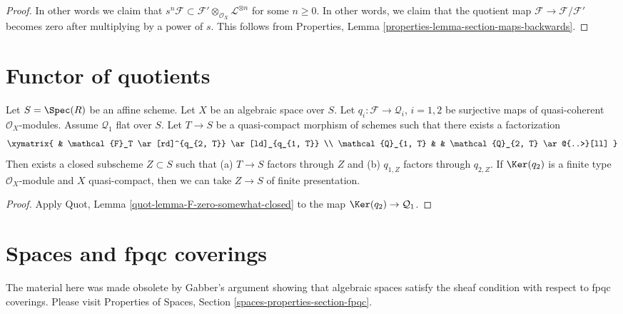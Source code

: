 \begin{proof}
In other words we claim that
$s^n\mathcal{F} \subset
\mathcal{F}' \otimes_{\mathcal{O}_X} \mathcal{L}^{\otimes n}$
for some $n \geq 0$. In other words, we claim that the quotient map
$\mathcal{F} \to \mathcal{F}/\mathcal{F}'$ becomes
zero after multiplying by a power of $s$.
This follows from Properties, Lemma
\ref{properties-lemma-section-maps-backwards}.
\end{proof}






\section{Functor of quotients}
\label{section-quotients}

\begin{lemma}
\label{lemma-factors-through-quotient}
Let $S = \Spec(R)$ be an affine scheme. Let $X$ be an algebraic space over
$S$. Let $q_i : \mathcal{F} \to \mathcal{Q}_i$, $i = 1, 2$
be surjective maps of quasi-coherent $\mathcal{O}_X$-modules.
Assume $\mathcal{Q}_1$ flat over $S$. Let $T \to S$ be a quasi-compact
morphism of schemes such that there exists a factorization
$$
\xymatrix{
& \mathcal{F}_T \ar[rd]^{q_{2, T}} \ar[ld]_{q_{1, T}} \\
\mathcal{Q}_{1, T} & & \mathcal{Q}_{2, T} \ar@{..>}[ll]
}
$$
Then exists a closed subscheme $Z \subset S$ such that
(a) $T \to S$ factors through $Z$ and (b)
$q_{1, Z}$ factors through $q_{2, Z}$.
If $\Ker(q_2)$ is a finite type $\mathcal{O}_X$-module and $X$
quasi-compact, then we can take $Z \to S$ of finite presentation.
\end{lemma}

\begin{proof}
Apply Quot, Lemma \ref{quot-lemma-F-zero-somewhat-closed}
to the map $\Ker(q_2) \to \mathcal{Q}_1$.
\end{proof}







\section{Spaces and fpqc coverings}
\label{section-fpqc}

\noindent
The material here was made obsolete by Gabber's argument showing that
algebraic spaces satisfy the sheaf condition with respect to fpqc
coverings. Please visit
Properties of Spaces, Section \ref{spaces-properties-section-fpqc}.

